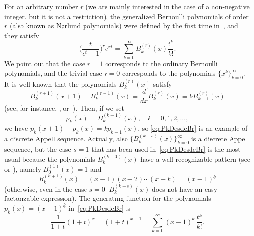 \documentclass[11pt]{article}
\theoremstyle{plain}
\theoremstyle{remark}
\numberwithin{equation}{section} %
\begin{document}
For an arbitrary number $r$ 
(we are mainly interested in the case of a non-negative integer, but it is not a restriction), 
the generalized Bernoulli polynomials of order $r$ (also known as N{\o}rlund polynomials) were defined by the first time in~\cite{Nor}, and they satisfy
\[
  \bigg(\frac{t}{e^t-1}\bigg)^r e^{xt} = \sum_{k=0}^{\infty} B_k^{(r)}(x) \frac{t^k}{k!}.
\]
We point out that the case $r=1$ corresponds to the ordinary Bernoulli polynomials, and the trivial case $r=0$ corresponds to the polynomials $\{x^k\}_{k=0}^{\infty}$.
It is well known that the polynomials $B_k^{(r)}(x)$ satisfy 
\begin{equation}
\label{eq:Bkrder}
  B_{k}^{(r+1)}(x+1) - B_{k}^{(r+1)}(x)
  = \frac{d}{dx} B_{k}^{(r)}(x) = k B_{k-1}^{(r)}(x)
\end{equation}
(see, for instance, \cite{Car}, \cite[\S\S\,6.11 and 6.3]{MT} or~\cite{Nor}).
Then, if we set 
\begin{equation}
\label{eq:PkDesdeBr}
  p_k(x) = B_{k}^{(k+1)}(x), \quad k=0,1,2,\dots,
\end{equation}
we have $p_k(x+1) - p_k(x) = k p_{k-1}(x)$, so \eqref{eq:PkDesdeBr} is an example of a discrete Appell sequence. Actually, also $\{B_{k}^{(k+s)}(x)\}_{k=0}^{\infty}$ is a discrete Appell sequence, but the case $s=1$ that has been used in~\eqref{eq:PkDesdeBr} is the most usual because the polynomials $B_k^{(k+1)}(x)$ have a well recognizable pattern (see \cite[\S\,6.4, p.~130]{MT} or \cite{Nor}), namely $B_0^{(1)}(x)=1$ and
\begin{equation}
\label{eq:Bkk+1}
  B_k^{(k+1)}(x) = (x-1)(x-2) \cdots (x-k) = (x-1)^{\underline{k}}
\end{equation}
(otherwise, even in the case $s=0$, $B_k^{(k+s)}(x)$ does not have an easy factorizable expression).
The generating function for the polynomials $p_k(x) = (x-1)^{\underline{k}}$ in~\eqref{eq:PkDesdeBr} is
\[
  \frac{1}{1+t} (1+t)^{x} = (1+t)^{x-1} = \sum_{k=0}^{\infty} (x-1)^{\underline{k}} \,\frac{t^k}{k!}.
\]
\end{document}
